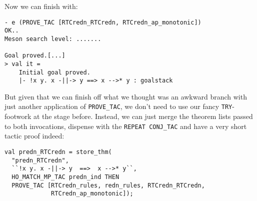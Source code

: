 Now we can finish with:
\begin{session}\begin{verbatim}
- e (PROVE_TAC [RTCredn_RTCredn, RTCredn_ap_monotonic])
OK..
Meson search level: .......

Goal proved.[...]
> val it =
    Initial goal proved.
    |- !x y. x -||-> y ==> x -->* y : goalstack
\end{verbatim}\end{session}
But given that we can finish off what we thought was an awkward branch
with just another application of \texttt{PROVE\_TAC}, we don't need to
use our fancy \texttt{TRY}-footwork at the stage before.  Instead, we
can just merge the theorem lists passed to both invocations, dispense
with the \texttt{REPEAT CONJ\_TAC} and have a very short tactic proof
indeed:
\begin{session}\begin{verbatim}
val predn_RTCredn = store_thm(
  "predn_RTCredn",
  ``!x y. x -||-> y  ==>  x -->* y``,
  HO_MATCH_MP_TAC predn_ind THEN
  PROVE_TAC [RTCredn_rules, redn_rules, RTCredn_RTCredn,
             RTCredn_ap_monotonic]);
\end{verbatim}\end{session}
\eos{}

